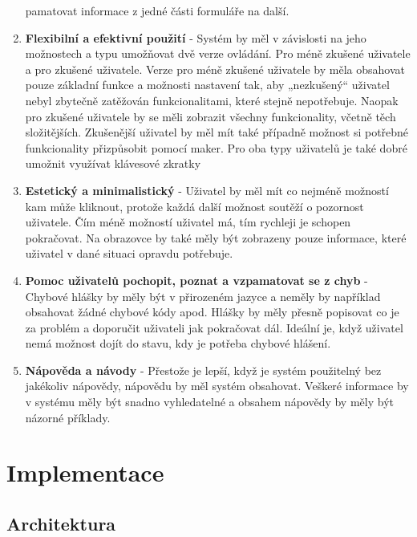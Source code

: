\documentclass[thesis=M,czech]{FITthesis}[2012/06/26]
\begin{document}
\begin{enumerate}
	pamatovat informace z jedné části formuláře na další.
	\item
	\textbf{Flexibilní a efektivní použití} - Systém by měl v závislosti na jeho možnostech a typu umožňovat dvě verze ovládání. Pro méně zkušené uživatele a pro zkušené uživatele. Verze pro méně zkušené uživatele by měla obsahovat pouze základní funkce a možnosti nastavení tak, aby „nezkušený“ uživatel nebyl zbytečně zatěžován funkcionalitami, které stejně nepotřebuje. Naopak pro zkušené uživatele by se	měli zobrazit všechny funkcionality, včetně těch složitějších. Zkušenější uživatel by měl mít také případně možnost si potřebné funkcionality přizpůsobit pomocí maker. Pro oba typy uživatelů je také dobré umožnit využívat klávesové zkratky
	\item
	\textbf{Estetický a minimalistický} - Uživatel by měl mít co nejméně možností kam může kliknout, protože každá
	další možnost soutěží o pozornost uživatele. Čím méně možností uživatel má,
	tím rychleji je schopen pokračovat. Na obrazovce by také měly být zobrazeny
	pouze informace, které uživatel v dané situaci opravdu potřebuje.
	\item
	\textbf{Pomoc uživatelů pochopit, poznat a vzpamatovat se z chyb} - Chybové hlášky by měly být v přirozeném jazyce a neměly by například obsahovat
	žádné chybové kódy apod. Hlášky by měly přesně popisovat co je za
	problém a doporučit uživateli jak pokračovat dál. Ideální je, když uživatel
	nemá možnost dojít do stavu, kdy je potřeba chybové hlášení.
	\item
	\textbf{Nápověda a návody} - Přestože je lepší, když je systém použitelný bez jakékoliv nápovědy, nápovědu
	by měl systém obsahovat. Veškeré informace by v systému měly být snadno
	vyhledatelné a obsahem nápovědy by měly být názorné příklady.
\end{enumerate} 





\chapter{Implementace}
\label{chap:implementace}

\section{Architektura}
\end{document}
